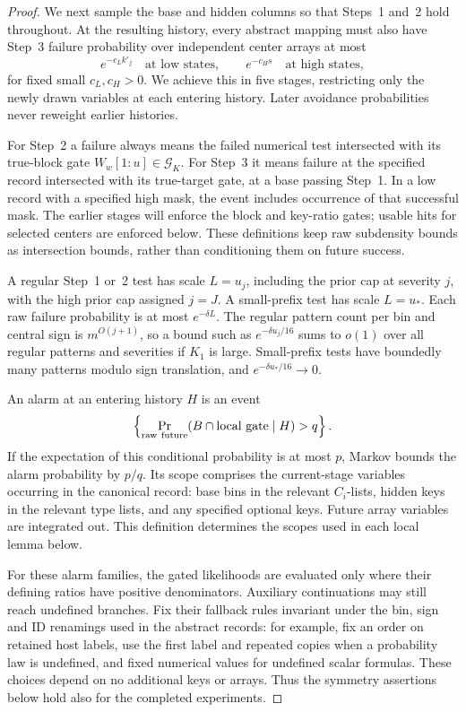 \begin{proof}
We next sample the base and hidden columns so that Steps~1 and~2 hold
throughout. At the resulting history, every abstract mapping must also
have Step~3 failure probability over independent center arrays at most
\[
 e^{-c_Lk'_j}\quad\text{at low states},\qquad
 e^{-c_Hs}\quad\text{at high states},
\]
for fixed small \(c_L,c_H>0\). We achieve this in five stages, restricting
only the newly drawn variables at each entering history. Later avoidance
probabilities never reweight earlier histories.

For Step~2 a failure always means the failed numerical test intersected
with its true-block gate \(W_w[1:u]\in\mathcal G_K\). For Step~3 it
means failure at the specified record intersected with its true-target
gate, at a base passing Step~1. In a low record with a specified high
mask, the event includes occurrence of that successful mask. The earlier
stages will enforce the block and key-ratio gates; usable hits for selected
centers are enforced below. These definitions keep raw subdensity bounds
as intersection bounds, rather than conditioning them on future success.

A regular Step~1 or~2 test has scale \(L=u_j\), including the prior cap
at severity \(j\), with the high prior cap assigned \(j=J\). A
small-prefix test has scale \(L=u_*\). Each raw failure probability is
at most \(e^{-\delta L}\). The regular pattern count per bin and
central sign is \(m^{O(j+1)}\), so a bound such as
\(e^{-\delta u_j/16}\) sums to \(o(1)\) over all regular patterns and
severities if \(K_1\) is large. Small-prefix tests have boundedly many
patterns modulo sign translation, and
\(e^{-\delta u_*/16}\to0\).

An alarm at an entering history \(H\) is an event
\[
 \left\{\Pr_{\rm raw\ future}(B\cap\text{local gate}\mid H)>q\right\}.
\]
If the expectation of this conditional probability is at most \(p\),
Markov bounds the alarm probability by \(p/q\). Its scope comprises the
current-stage variables occurring in the canonical record: base bins in
the relevant \(C_i\)-lists, hidden keys in the relevant type lists, and
any specified optional keys. Future array variables are integrated out.
This definition determines the scopes used in each local lemma below.

For these alarm families, the gated likelihoods are evaluated only where
their defining ratios have positive denominators. Auxiliary continuations
may still reach undefined branches. Fix their fallback rules invariant
under the bin, sign and ID renamings used in the abstract records: for
example, fix an order on retained host labels, use the first label and
repeated copies when a probability law is undefined, and fixed numerical
values for undefined scalar formulas. These choices depend on no
additional keys or arrays. Thus the symmetry assertions below hold also
for the completed experiments.


\end{proof}
